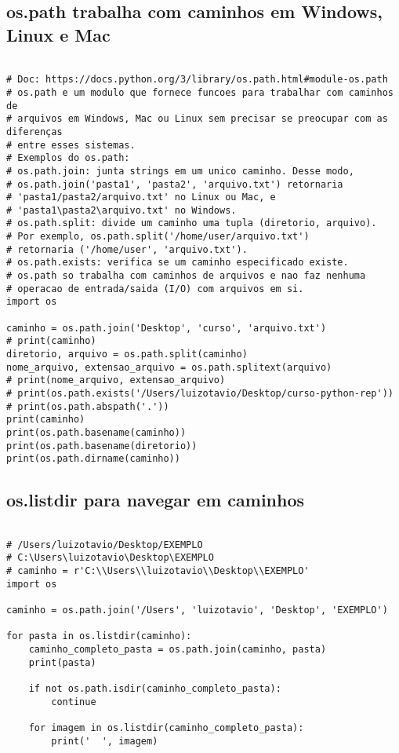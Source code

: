 \documentclass{article}
\begin{document}
\subsection{ os.path trabalha com caminhos em Windows, Linux e Mac}
\begin{lstlisting}
    
# Doc: https://docs.python.org/3/library/os.path.html#module-os.path
# os.path e um modulo que fornece funcoes para trabalhar com caminhos de
# arquivos em Windows, Mac ou Linux sem precisar se preocupar com as diferenças
# entre esses sistemas.
# Exemplos do os.path:
# os.path.join: junta strings em um unico caminho. Desse modo,
# os.path.join('pasta1', 'pasta2', 'arquivo.txt') retornaria
# 'pasta1/pasta2/arquivo.txt' no Linux ou Mac, e
# 'pasta1\pasta2\arquivo.txt' no Windows.
# os.path.split: divide um caminho uma tupla (diretorio, arquivo).
# Por exemplo, os.path.split('/home/user/arquivo.txt')
# retornaria ('/home/user', 'arquivo.txt').
# os.path.exists: verifica se um caminho especificado existe.
# os.path so trabalha com caminhos de arquivos e nao faz nenhuma
# operacao de entrada/saida (I/O) com arquivos em si.
import os

caminho = os.path.join('Desktop', 'curso', 'arquivo.txt')
# print(caminho)
diretorio, arquivo = os.path.split(caminho)
nome_arquivo, extensao_arquivo = os.path.splitext(arquivo)
# print(nome_arquivo, extensao_arquivo)
# print(os.path.exists('/Users/luizotavio/Desktop/curso-python-rep'))
# print(os.path.abspath('.'))
print(caminho)
print(os.path.basename(caminho))
print(os.path.basename(diretorio))
print(os.path.dirname(caminho))
\end{lstlisting}

\subsection{ os.listdir para navegar em caminhos}
\begin{lstlisting}
    
# /Users/luizotavio/Desktop/EXEMPLO
# C:\Users\luizotavio\Desktop\EXEMPLO
# caminho = r'C:\\Users\\luizotavio\\Desktop\\EXEMPLO'
import os

caminho = os.path.join('/Users', 'luizotavio', 'Desktop', 'EXEMPLO')

for pasta in os.listdir(caminho):
    caminho_completo_pasta = os.path.join(caminho, pasta)
    print(pasta)

    if not os.path.isdir(caminho_completo_pasta):
        continue

    for imagem in os.listdir(caminho_completo_pasta):
        print('  ', imagem)
\end{lstlisting}
\end{document}
